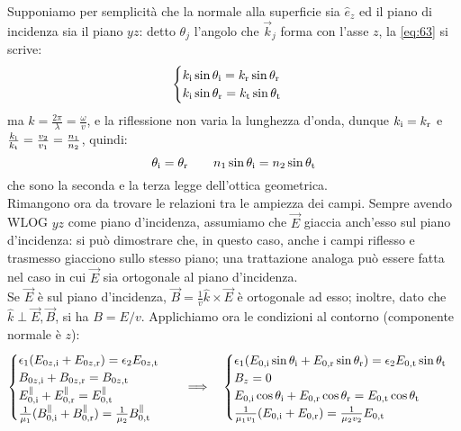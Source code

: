 %
Supponiamo per semplicità che la normale alla superficie sia $ \hat{e}_z $ ed il piano di incidenza sia il piano $ yz $: detto $ \theta_j $ l'angolo che $ \vec{k}_j $ forma con l'asse $ z $, la \ref{eq:63} si scrive:
\begin{equation}
	\begin{cases}
		k_{\text{i}} \sin\theta_{\text{i}} = k_{\text{r}} \sin\theta_{\text{r}} \\ 
		k_{\text{i}} \sin\theta_{\text{r}} = k_{\text{t}} \sin\theta_{\text{t}}
	\end{cases}
	\label{eq:64}
\end{equation}
ma $ k = \frac{2\pi}{\lambda} = \frac{\omega}{v} $, e la riflessione non varia la lunghezza d'onda, dunque $ k_{\text{i}} = k_{\text{r}} $ e $ \frac{k_{\text{i}}}{k_{\text{t}}} = \frac{v_2}{v_1} = \frac{n_1}{n_2} $, quindi:
\begin{equation}
	\theta_{\text{i}} = \theta_{\text{r}} \qquad n_1 \sin\theta_{\text{i}} = n_2 \sin\theta_{\text{t}}
	\label{eq:65}
\end{equation}
che sono la seconda e la terza legge dell'ottica geometrica. \\ 
%
Rimangono ora da trovare le relazioni tra le ampiezza dei campi. Sempre avendo WLOG $ yz $ come piano d'incidenza, assumiamo che $ \vec{E} $ giaccia anch'esso sul piano d'incidenza: si può dimostrare che, in questo caso, anche i campi riflesso e trasmesso giacciono sullo stesso piano; una trattazione analoga può essere fatta nel caso in cui $ \vec{E} $ sia ortogonale al piano d'incidenza. \\ 
Se $ \vec{E} $ è sul piano d'incidenza, $ \vec{B} = \frac{1}{v} \hat{k}\times\vec{E} $ è ortogonale ad esso; inoltre, dato che $ \hat{k}\perp\vec{E},\vec{B} $, si ha $ B = E / v $. Applichiamo ora le condizioni al contorno (componente normale è $ z $):
\begin{equation}
	\begin{cases}
		\epsilon_1 (E_{0z,\text{i}} + E_{0z,\text{r}}) = \epsilon_2 E_{0z,\text{t}} \\ 
		B_{0z,\text{i}} + B_{0z,\text{r}} = B_{0z,\text{t}} \\ 
		E^{\parallel}_{0,\text{i}} + E^{\parallel}_{0,\text{r}} = E^{\parallel}_{0,\text{t}} \\ 
		\frac{1}{\mu_1}(B^{\parallel}_{0,\text{i}} + B^{\parallel}_{0,\text{r}}) = \frac{1}{\mu_2}B^{\parallel}_{0,\text{t}}
	\end{cases}
	\quad\Longrightarrow\quad
	\begin{cases}
		\epsilon_1 (E_{0,\text{i}}\sin\theta_{\text{i}} + E_{0,\text{r}}\sin\theta_{\text{r}}) = \epsilon_2 E_{0,\text{t}}\sin\theta_{\text{t}} \\ 
		B_z = 0 \\ 
		E_{0,\text{i}} \cos\theta_{\text{i}} + E_{0,\text{r}} \cos\theta_{\text{r}} = E_{0,\text{t}} \cos\theta_{\text{t}} \\ 
		\frac{1}{\mu_1 v_1}(E_{0,\text{i}} + E_{0,\text{r}}) = \frac{1}{\mu_2 v_2}E_{0,\text{t}}
	\end{cases}
	\label{eq:66}
\end{equation}
